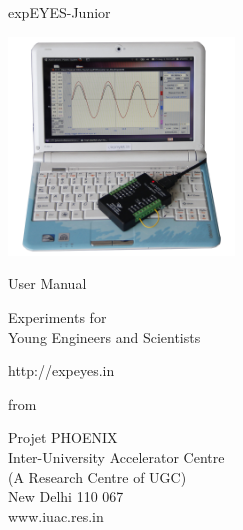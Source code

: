 \documentclass[12pt,a4paper]{report}
\begin{document}
\begin{titlepage}
\thispagestyle{empty}

\vspace{0.2in}

\begin{center}
{\Huge{}expEYES-Junior}
\par\end{center}{\Huge \par}

\begin{center}
\includegraphics[width=6cm]{../../pics/ej-with-pc-lr.jpg}
\par\end{center}

\begin{center}
{\large{}User Manual }
\par\end{center}{\large \par}

\begin{center}
{\LARGE{} Experiments for}\\
{\LARGE{} Young Engineers and Scientists}
\par\end{center}{\LARGE \par}

\begin{center}
http://expeyes.in
\par\end{center}

\begin{center}
from
\par\end{center}

\begin{center}
Projet PHOENIX\\
Inter-University Accelerator Centre \\
(A Research Centre of UGC)\\
New Delhi 110 067\\
www.iuac.res.in
\par\end{center}

\end{titlepage}
\end{document}
